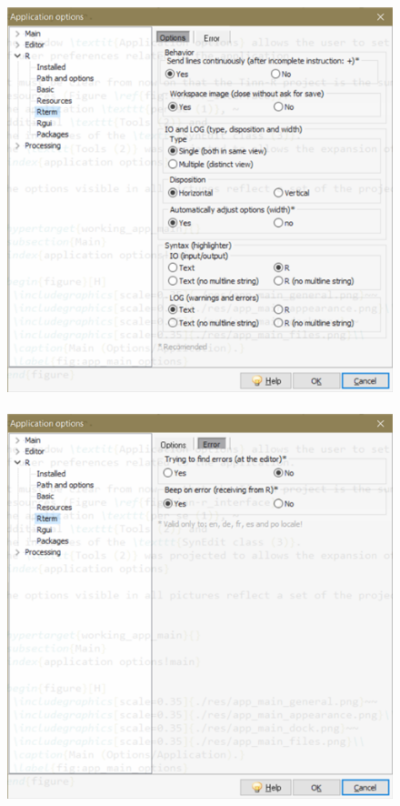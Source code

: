 \begin{figure}[h!]
  \includegraphics[scale=0.6]{./res/app_r_rterm_options.png}~~
  \includegraphics[scale=0.6]{./res/app_r_rterm_error.png}\\

\end{figure}

